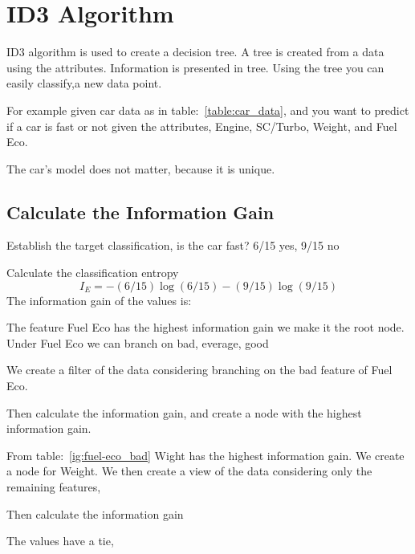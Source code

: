 \documentclass[a4paper]{article}
\begin{document}
\section{ID3 Algorithm}
ID3 algorithm is used to create a decision tree. A tree is created from a data using the attributes. Information is presented in tree. Using the tree you can easily classify,a new data point.

For example given car data as in table:~\ref{table:car_data}, and you want to predict if a car is fast or not given the attributes, Engine, SC/Turbo, Weight, and Fuel Eco.

The car's model does not matter, because it is unique.


\subsection{Calculate the Information Gain}

Establish the target classification, is the car fast?
6/15 yes, 9/15 no

Calculate the classification entropy
\begin{equation}
    I_E = -(6/15)\log(6/15) - (9/15)\log(9/15)
\end{equation}
The information gain of the values is:



The feature Fuel Eco has the highest information gain we make it the root node. Under Fuel Eco we can branch on bad, everage, good

We create a filter of the data considering branching on the bad feature of Fuel Eco.


Then calculate the information gain, and create a node with the highest information gain.


From table:~\ref{ig:fuel-eco_bad} Wight has the highest information gain. We create a node for Weight.
We then create a view of the data considering only the remaining features,


Then calculate the information gain 

The values have a tie,
\end{document}
